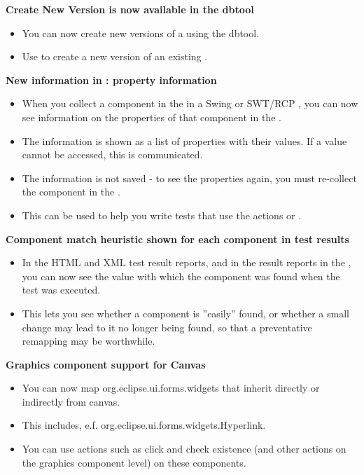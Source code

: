 \textbf{Create New Version is now available in the dbtool}
\begin{itemize}
\item You can now create new versions of a \gdproject{} using the dbtool.
\item Use  to create a new version of an existing \gdproject{}.
\end{itemize}

\textbf{New information in \gdomm{} : property information}
\begin{itemize}
\item When you collect a component in the \gdomm{} in a Swing or SWT/RCP \gdaut{}, you can now see information on the properties of that component in the \gdpropview{}.
\item The information is shown as a list of properties with their values. If a value cannot be accessed, this is communicated.
\item The information is not saved - to see the properties again, you must re-collect the component in the \gdomm{}.
\item This can be used to help you write tests that use the actions  or .
\end{itemize}

\textbf{Component match heuristic shown for each component in test results}
\begin{itemize}
\item In the HTML and XML test result reports, and in the result reports in the \ite{}, you can now see the value with which the component was found when the test was executed.
\item This lets you see whether a component is ''easily'' found, or whether a small change may lead to it no longer being found, so that a preventative remapping may be worthwhile.
\end{itemize}

\textbf{Graphics component support for Canvas}
\begin{itemize}
\item You can now map org.eclipse.ui.forms.widgets that inherit directly or indirectly from canvas. 
\item This includes, e.f. org.eclipse.ui.forms.widgets.Hyperlink.
\item You can use actions such as click and check existence (and other actions on the graphics component level) on these components.
\end{itemize}

